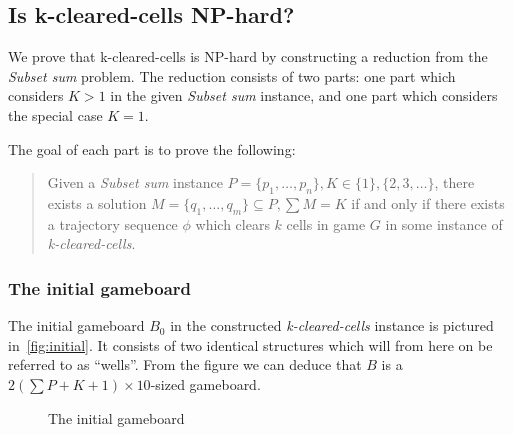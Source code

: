 \subsection{Is k-cleared-cells NP-hard?}

We prove that k-cleared-cells is NP-hard by constructing a reduction from the \textit{Subset sum} problem. The reduction consists of two parts: one part which considers $K > 1$ in the given \textit{Subset sum} instance, and one part which considers the special case $K = 1$.

The goal of each part is to prove the following: 

\begin{quote}
Given a \textit{Subset sum} instance $P = \{p_1, \ldots, p_n\}, K \in \{1\} ,\{2, 3, \ldots \}$, there exists a solution $M = \{q_1, \ldots, q_m \} \subseteq P, \sum M = K$ if and only if there exists a trajectory sequence $\phi$ which clears $k$ cells in game $G$ in some instance of \textit{k-cleared-cells}.
\end{quote}

\subsubsection{The initial gameboard}

The initial gameboard $B_0$ in the constructed \textit{k-cleared-cells} instance is pictured in~\autoref{fig:initial}. It consists of two identical structures which will from here on be referred to as ``wells''. From the figure we can deduce that $B$ is a $2 \left( \sum P + K + 1 \right) \times 10$-sized gameboard.

\begin{figure}[H]
    \centering
    \caption{The initial gameboard}
    \label{fig:initial}
\end{figure}

